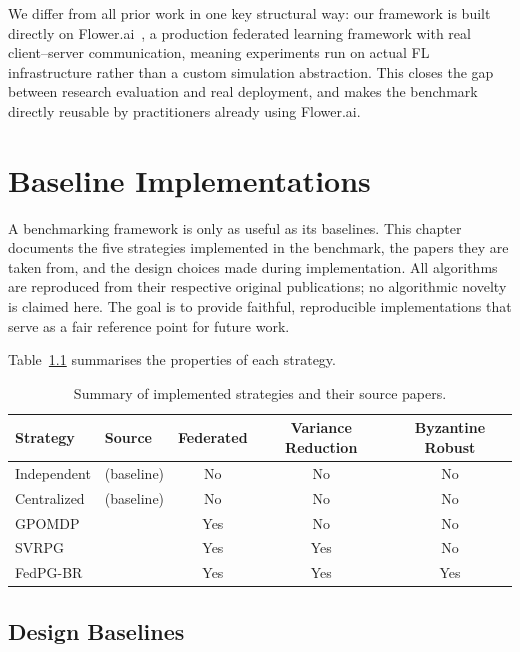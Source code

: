 \documentclass[a4paper, oneside]{discothesis}
\begin{document}
We differ from all prior work in one key structural way: our framework is built directly on Flower.ai~\cite{Flower}, a production federated learning framework with real client--server communication, meaning experiments run on actual FL infrastructure rather than a custom simulation abstraction. This closes the gap between research evaluation and real deployment, and makes the benchmark directly reusable by practitioners already using Flower.ai.


\chapter{Baseline Implementations}
\label{chap:algorithms}

A benchmarking framework is only as useful as its baselines. This chapter documents the five strategies implemented in the benchmark, the papers they are taken from, and the design choices made during implementation. All algorithms are reproduced from their respective original publications; no algorithmic novelty is claimed here. The goal is to provide faithful, reproducible implementations that serve as a fair reference point for future work.

Table~\ref{tab:strategies} summarises the properties of each strategy.

\begin{table}[h]
\centering
\caption{Summary of implemented strategies and their source papers.}
\label{tab:strategies}
\begin{tabular}{llccc}
\hline
\textbf{Strategy} & \textbf{Source} & \textbf{Federated} & \textbf{Variance Reduction} & \textbf{Byzantine Robust} \\
\hline
Independent  & (baseline)            & No  & No  & No \\
Centralized  & (baseline)            & No  & No  & No \\
GPOMDP        & \cite{GPOMDP}   & Yes & No  & No \\
SVRPG        & \cite{SVRPG}   & Yes & Yes & No \\
FedPG-BR     & \cite{FedPGBR}   & Yes & Yes & Yes \\
\hline
\end{tabular}
\end{table}

\section{Design Baselines}
\label{sec:baselines}
\end{document}
